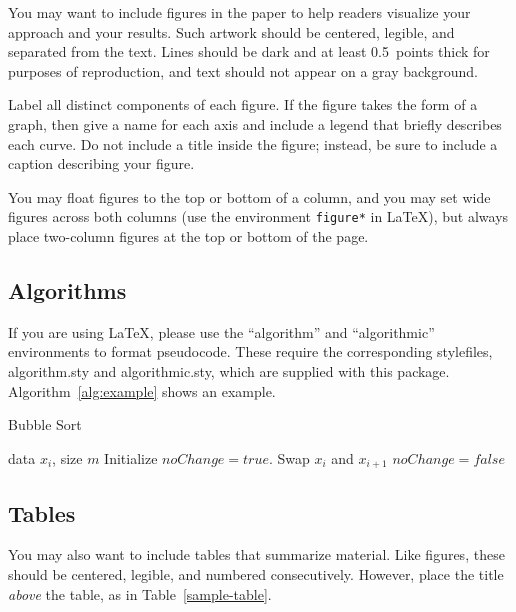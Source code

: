 \documentclass{article}
\begin{document}
You may want to include figures in the paper to help readers visualize
your approach and your results. Such artwork should be centered,
legible, and separated from the text. Lines should be dark and at
least 0.5~points thick for purposes of reproduction, and text should
not appear on a gray background.

Label all distinct components of each figure. If the figure takes the
form of a graph, then give a name for each axis and include a legend
that briefly describes each curve. Do not include a title inside the
figure; instead, be sure to include a caption describing your figure.

You may float figures to the top or
bottom of a column, and you may set wide figures across both columns
(use the environment {\tt figure*} in \LaTeX), but always place
two-column figures at the top or bottom of the page.

\subsection{Algorithms}

If you are using \LaTeX, please use the ``algorithm'' and ``algorithmic'' 
environments to format pseudocode. These require 
the corresponding stylefiles, algorithm.sty and 
algorithmic.sty, which are supplied with this package. 
Algorithm~\ref{alg:example} shows an example. 

\begin{algorithm}[tb]
   \caption{Bubble Sort}
   \label{alg:example}
\begin{algorithmic}
    data $x_i$, size $m$
   \REPEAT
   \STATE Initialize $noChange = true$.
   \STATE Swap $x_i$ and $x_{i+1}$
   \STATE $noChange = false$
   \ENDIF
   \ENDFOR
\end{algorithmic}
\end{algorithm}
 
\subsection{Tables} 
 
You may also want to include tables that summarize material. Like 
figures, these should be centered, legible, and numbered consecutively. 
However, place the title {\it above\/} the table, as in 
Table~\ref{sample-table}.
\end{document}
